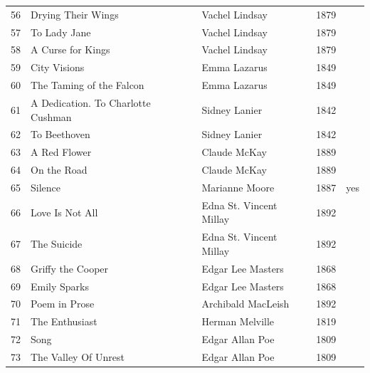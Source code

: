 \documentclass{book}
\begin{document}
\begin{table}[h!]
\begin{tabular}{lllll}
56 & Drying Their Wings & Vachel Lindsay & 1879 \\
57 & To Lady Jane & Vachel Lindsay & 1879 \\
58 & A Curse for Kings & Vachel Lindsay & 1879 \\
59 & City Visions & Emma Lazarus & 1849 \\
60 & The Taming of the Falcon & Emma Lazarus & 1849 \\
61 & A Dedication. To Charlotte Cushman & Sidney Lanier & 1842 \\
62 & To Beethoven & Sidney Lanier & 1842 \\
63 & A Red Flower & Claude McKay & 1889 \\
64 & On the Road & Claude McKay & 1889 \\
65 & Silence & Marianne Moore & 1887 & yes \\
66 & Love Is Not All & Edna St. Vincent Millay & 1892 \\
67 & The Suicide & Edna St. Vincent Millay & 1892 \\
68 & Griffy the Cooper & Edgar Lee Masters & 1868 \\
69 & Emily Sparks & Edgar Lee Masters & 1868 \\
70 & Poem in Prose & Archibald MacLeish & 1892 \\
71 & The Enthusiast & Herman Melville & 1819 \\
72 & Song & Edgar Allan Poe & 1809 \\
73 & The Valley Of Unrest & Edgar Allan Poe & 1809 \\
\bottomrule
\end{tabular}
\end{table}
\end{document}
